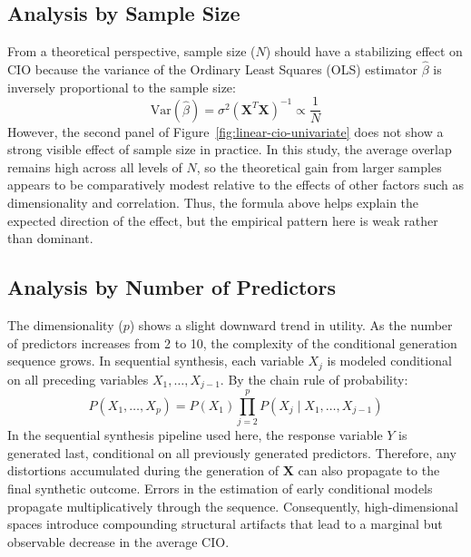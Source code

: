 \subsection{Analysis by Sample Size}
From a theoretical perspective, sample size ($N$) should have a stabilizing effect on CIO because the variance of the Ordinary Least Squares (OLS) estimator $\hat{\beta}$ is inversely proportional to the sample size:
\begin{equation}
    \text{Var}(\hat{\beta}) = \sigma^2 (\mathbf{X}^T \mathbf{X})^{-1} \propto \frac{1}{N}
\end{equation}
However, the second panel of Figure~\ref{fig:linear-cio-univariate} does not show a strong visible effect of sample size in practice. In this study, the average overlap remains high across all levels of $N$, so the theoretical gain from larger samples appears to be comparatively modest relative to the effects of other factors such as dimensionality and correlation. Thus, the formula above helps explain the expected direction of the effect, but the empirical pattern here is weak rather than dominant.

\subsection{Analysis by Number of Predictors}
The dimensionality ($p$) shows a slight downward trend in utility. As the number of predictors increases from 2 to 10, the complexity of the conditional generation sequence grows. In sequential synthesis, each variable $X_j$ is modeled conditional on all preceding variables $X_1, \dots, X_{j-1}$. By the chain rule of probability:
\begin{equation}
    P(X_1, \dots, X_p) = P(X_1) \prod_{j=2}^{p} P(X_j \mid X_1, \dots, X_{j-1})
\end{equation}
In the sequential synthesis pipeline used here, the response variable $Y$ is generated last, conditional on all previously generated predictors. Therefore, any distortions accumulated during the generation of $\mathbf{X}$ can also propagate to the final synthetic outcome.
Errors in the estimation of early conditional models propagate multiplicatively through the sequence. Consequently, high-dimensional spaces introduce compounding structural artifacts that lead to a marginal but observable decrease in the average CIO.


